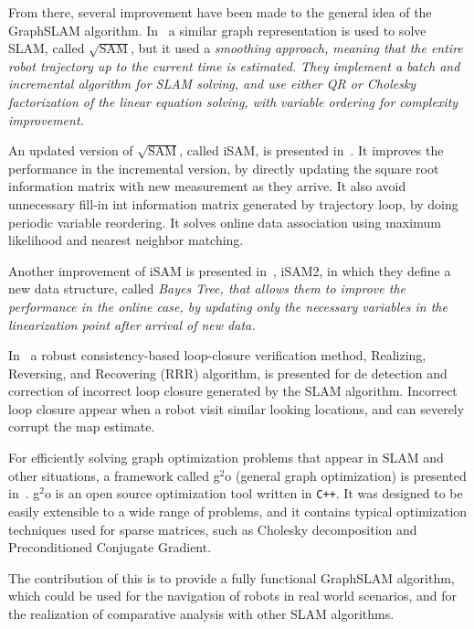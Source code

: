 From there, several improvement have been made to the general idea of the GraphSLAM algorithm. In~\cite{sqrtsam} a similar graph representation is used to solve SLAM, called $\sqrt{\text{SAM}}$, but it used a \it{smoothing} approach, meaning that the entire robot trajectory up to the current time is estimated. They implement a batch and incremental algorithm for SLAM solving, and use either QR or Cholesky factorization of the linear equation solving, with variable ordering for complexity improvement. 

An updated version of $\sqrt{\text{SAM}}$, called iSAM, is presented in~\cite{isam}. It improves the performance in the incremental version, by directly updating the square root information matrix with new measurement as they arrive. It also avoid unnecessary fill-in int information matrix generated by trajectory loop, by doing periodic variable reordering. It solves online data association using maximum likelihood and nearest neighbor matching.

Another improvement of iSAM is presented in~\cite{isam2}, iSAM2, in which they define a new data structure, called \it{Bayes Tree}, that allows them to improve the performance in the online case, by updating only the necessary variables in the linearization point after arrival of new data. 

In~\cite{robustloop} a robust consistency-based loop-closure verification method, Realizing, Reversing, and Recovering (RRR) algorithm, is presented for de detection and correction of incorrect loop closure generated by the SLAM algorithm. Incorrect loop closure appear when a robot visit similar looking locations, and can severely corrupt the map estimate.     

For efficiently solving graph optimization problems that appear in SLAM and other situations, a framework called g$^2$o (general graph optimization) is presented in~\cite{g2o}. g$^2$o is an open source optimization tool written in \verb!C++!.  It was designed to be easily extensible to a wide range of problems, and it contains typical optimization techniques used for sparse matrices, such as Cholesky decomposition and Preconditioned Conjugate Gradient. 

The contribution of this \mem{} is to provide a fully functional GraphSLAM algorithm, which could be used for the navigation of robots in real world scenarios, and for the realization of comparative analysis with other SLAM algorithms.